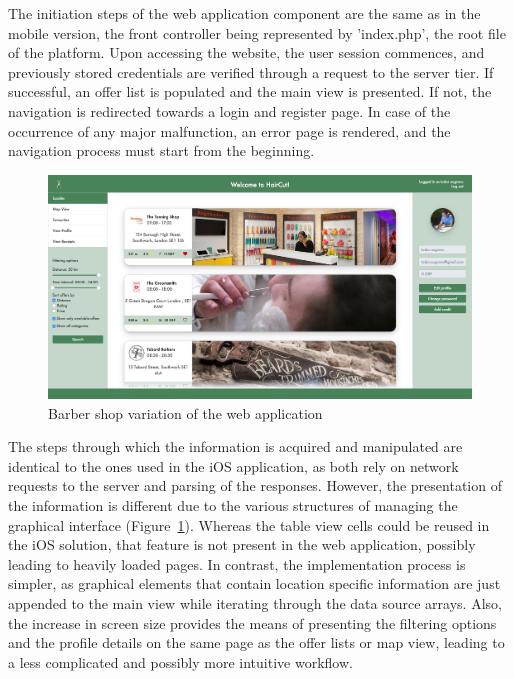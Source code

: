 The initiation steps of the web application component are the same as in the mobile version, the front controller being represented by 'index.php', the root file of the platform. Upon accessing the website, the user session commences, and previously stored credentials are verified through a request to the server tier. If successful, an offer list is populated and the main view is presented. If not, the navigation is redirected towards a login and register page. In case of the occurrence of any major malfunction, an error page is rendered, and the navigation process must start from the beginning. \\

\begin{figure}[!ht]
\centering
\includegraphics[scale=0.15]{img/barbers-web.png}
\caption{Barber shop variation of the web application}
\label{fig:barbers_web}
\end{figure}

The steps through which the information is acquired and manipulated are identical to the ones used in the iOS application, as both rely on network requests to the server and parsing of the responses. However, the presentation of the information is different due to the various structures of managing the graphical interface (Figure~\ref{fig:barbers_web}). Whereas the table view cells could be reused in the iOS solution, that feature is not present in the web application, possibly leading to heavily loaded pages. In contrast, the implementation process is simpler, as graphical elements that contain location specific information are just appended to the main view while iterating through the data source arrays. Also, the increase in screen size provides the means of presenting the filtering options and the profile details on the same page as the offer lists or map view, leading to a less complicated and possibly more intuitive workflow.\\


